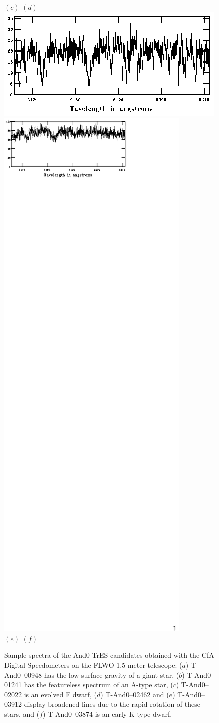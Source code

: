 \begin{figure}
\begin{center}
\textsc{\small $(c)$    \hspace{7cm}    $(d)$}\\
\includegraphics[width=.45\textwidth]{2_f4e}
\hspace{1cm}
\includegraphics[width=.45\textwidth]{2_f4f} \\
\textsc{\small $(e)$    \hspace{7cm}    $(f)$}
\caption[Sample spectra of the And0 transit candidates]{
Sample spectra of the And0 TrES candidates obtained with the CfA Digital Speedometers on the FLWO 1.5-meter telescope:
 ($a$) \mbox{T-And0--00948} has the low surface gravity of a giant star, ($b$) \mbox{T-And0--01241} has the featureless
 spectrum of an A-type star, ($c$) \mbox{T-And0--02022} is an evolved F dwarf,  ($d$) \mbox{T-And0--02462} and ($e$)
 \mbox{T-And0--03912} display broadened lines due to the rapid rotation of these stars, and ($f$) \mbox{T-And0--03874}
 is an early K-type dwarf.
}\label{cha:and0:fig:spectra}
\end{center}
\end{figure}

